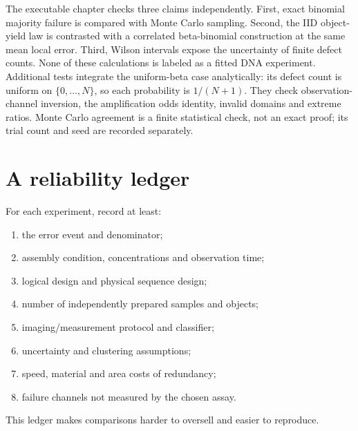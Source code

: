 The executable chapter checks three claims independently. First, exact binomial
majority failure is compared with Monte Carlo sampling. Second, the IID object-yield
law is contrasted with a correlated beta-binomial construction at the same mean
local error. Third, Wilson intervals expose the uncertainty of finite defect counts.
None of these calculations is labeled as a fitted DNA experiment.
Additional tests integrate the uniform-beta case analytically: its defect count is
uniform on $\{0,\ldots,N\}$, so each probability is $1/(N+1)$.
They check observation-channel inversion, the amplification odds identity, invalid
domains and extreme ratios. Monte Carlo agreement is a finite statistical check,
not an exact proof; its trial count and seed are recorded separately.

\section{A reliability ledger}

For each experiment, record at least:
\begin{enumerate}
\item the error event and denominator;
\item assembly condition, concentrations and observation time;
\item logical design and physical sequence design;
\item number of independently prepared samples and objects;
\item imaging/measurement protocol and classifier;
\item uncertainty and clustering assumptions;
\item speed, material and area costs of redundancy;
\item failure channels not measured by the chosen assay.
\end{enumerate}
This ledger makes comparisons harder to oversell and easier to reproduce.

